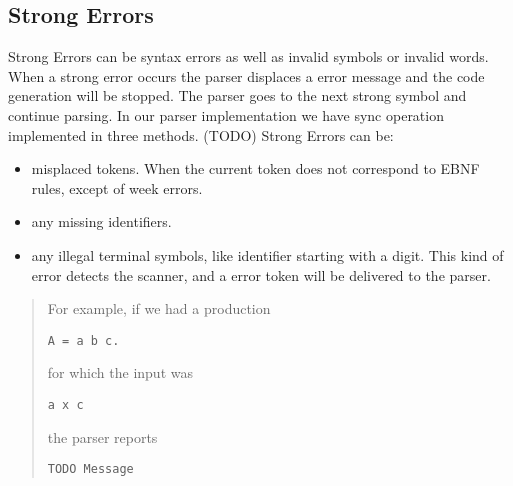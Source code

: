 \subsection{Strong Errors}
\label{label_strong_errors}
Strong Errors can be syntax errors as well as invalid symbols or invalid words. When a strong error occurs the parser displaces a error
message and the code generation will be stopped. The parser goes to the next strong symbol and continue parsing. In our parser
implementation we have sync operation implemented in three methods. (TODO)
Strong Errors can be:
\begin{itemize}
  \item misplaced tokens. When the current token does not correspond to EBNF rules, except of week errors.
  \item any missing identifiers.
  \item any illegal terminal symbols, like identifier starting with a digit. This kind of error detects the scanner, and a
  error token will be delivered to the parser.
\end{itemize}
\begin{quotation}
For example, if we had a production
\begin{verbatim}
A = a b c.
\end{verbatim}
for which the input was
\begin{verbatim}
a x c
\end{verbatim}
the parser reports
\begin{verbatim}
TODO Message
\end{verbatim}
\end{quotation}
